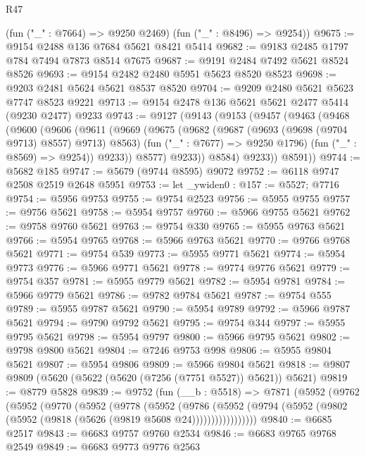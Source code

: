\begin{lexlean}{R47}
\begin{coremodule}
      (fun ("_" : @7664) => @9250 @2469)
      (fun ("_" : @8496) => @9254))
@9675 := @9154 @2488 @136 @7684 @5621 @8421 @5414
@9682 := @9183 @2485 @1797 @784 @7494 @7873 @8514 @7675
@9687 := @9191 @2484 @7492 @5621 @8524 @8526
@9693 := @9154 @2482 @2480 @5951 @5623 @8520 @8523
@9698 := @9203 @2481 @5624 @5621 @8537 @8520
@9704 := @9209 @2480 @5621 @5623 @7747 @8523 @9221
@9713 := @9154 @2478 @136 @5621 @5621 @2477 @5414 (@9230 @2477) @9233
@9743 := @9127
    (@9143
      (@9153
        (@9457
          (@9463
            (@9468
              (@9600
                (@9606
                  (@9611
                    (@9669
                      (@9675
                        (@9682
                          (@9687 (@9693 (@9698 (@9704 @9713) @8557) @9713) @8563)
                          (fun ("_" : @7677) => @9250 @1796)
                          (fun ("_" : @8569) => @9254))
                        @9233))
                    @8577)
                  @9233))
              @8584)
            @9233))
        @8591))
@9744 := @5682 @185
@9747 := @5679 (@9744 @8595) @9072
@9752 := @6118 @9747 @2508 @2519 @2648 @5951
@9753 := let _ywiden0 : @157 := @5527; @7716
@9754 := @5956 @9753
@9755 := @9754 @2523
@9756 := @5955 @9755
@9757 := @9756 @5621
@9758 := @5954 @9757
@9760 := @5966 @9755 @5621
@9762 := @9758 @9760 @5621
@9763 := @9754 @330
@9765 := @5955 @9763 @5621
@9766 := @5954 @9765
@9768 := @5966 @9763 @5621
@9770 := @9766 @9768 @5621
@9771 := @9754 @539
@9773 := @5955 @9771 @5621
@9774 := @5954 @9773
@9776 := @5966 @9771 @5621
@9778 := @9774 @9776 @5621
@9779 := @9754 @357
@9781 := @5955 @9779 @5621
@9782 := @5954 @9781
@9784 := @5966 @9779 @5621
@9786 := @9782 @9784 @5621
@9787 := @9754 @555
@9789 := @5955 @9787 @5621
@9790 := @5954 @9789
@9792 := @5966 @9787 @5621
@9794 := @9790 @9792 @5621
@9795 := @9754 @344
@9797 := @5955 @9795 @5621
@9798 := @5954 @9797
@9800 := @5966 @9795 @5621
@9802 := @9798 @9800 @5621
@9804 := @7246 @9753 @998
@9806 := @5955 @9804 @5621
@9807 := @5954 @9806
@9809 := @5966 @9804 @5621
@9818 := @9807 @9809 (@5620 (@5622 (@5620 (@7256 (@7751 @5527)) @5621)) @5621)
@9819 := @8779 @5828
@9839 := @9752
    (fun (__b : @5518) =>
    @7871
      (@5952
        (@9762
          (@5952
            (@9770
              (@5952
                (@9778
                  (@5952
                    (@9786
                      (@5952
                        (@9794 (@5952 (@9802 (@5952 (@9818 (@5626 (@9819 @5608 @24)))))))))))))))))
@9840 := @6685 @2517
@9843 := @6683 @9757 @9760 @2534
@9846 := @6683 @9765 @9768 @2549
@9849 := @6683 @9773 @9776 @2563

\end{coremodule}
\end{lexlean}
